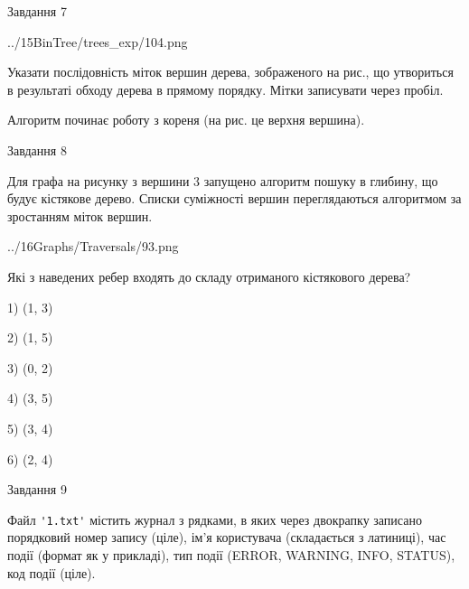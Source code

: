 \documentclass[12pt, ukrainian]{article}
\def\code#1{\Verb!#1!}
\begin{document}
{\vspace{10mm}\par

\newpage
\begin{minipage}[t]{9.7cm}
               
{\begin{center}Завдання {7}\end{center}}
\vspace{-4mm}

\begin{center}
	{../15BinTree/trees_exp/104.png}
\end{center}
Указати послідовність міток вершин дерева, зображеного на рис., що утвориться в результаті обходу дерева в прямому порядку. Мітки записувати через пробіл.\par Алгоритм починає роботу з кореня (на рис. це верхня вершина).\par

\end{minipage}
\vline \hspace{8mm}
\begin{minipage}[t]{8.0cm}
               
{\begin{center}Завдання {8}\end{center}}
\vspace{-4mm}
Для графа на рисунку з вершини 3 запущено алгоритм пошуку в глибину, що будує кістякове дерево. Списки суміжності вершин переглядаються алгоритмом за зростанням міток вершин.\par
\begin{center}
	{../16Graphs/Traversals/93.png}
\end{center}
\par Які з наведених ребер входять до складу отриманого кістякового дерева?\par
1) (1, 3)\par
2) (1, 5)\par
3) (0, 2)\par
4) (3, 5)\par
5) (3, 4)\par
6) (2, 4)\par
{\vskip 15pt} \par

\end{minipage}

               
{\begin{center}Завдання {9}\end{center}}
\vspace{-4mm}
Файл \code{'1.txt'} містить журнал з рядками, в яких через двокрапку записано поряд\-ко\-вий номер запису (ціле), ім'я користувача (складається з латиниці), час події (фор\-мат як у прикладі), тип події (ERROR, WARNING, INFO, STATUS), код події (ціле).

}
\end{document}
